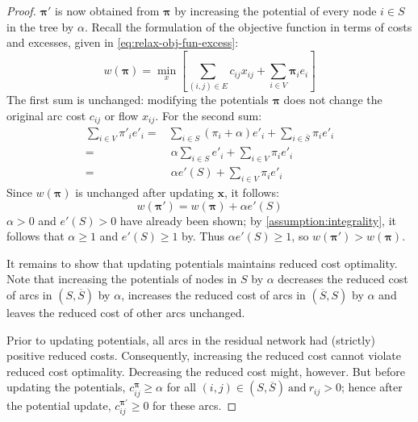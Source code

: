 \begin{proof}
$\boldsymbol{\pi}'$ is now obtained from $\boldsymbol{\pi}$ by increasing the potential of every node $i \in S$ in the tree by $\alpha$. Recall the formulation of the objective function in terms of costs and excesses, given in \cref{eq:relax-obj-fun-excess}:
\[w\left(\boldsymbol{\pi}\right)=\min_{x}\left[\sum_{\left(i,j\right)\in E}c_{ij}x_{ij}+\sum_{i\in V}\boldsymbol{\pi}_{i}e_{i}\right]\]
The first sum is unchanged: modifying the potentials $\boldsymbol{\pi}$ does not change the original arc cost $c_{ij}$ or flow $x_{ij}$. For the second sum:
\begin{align*}
\sum_{i\in V}\pi'_{i}e'_{i}= & \sum_{i\in S}\left(\pi_{i}+\alpha\right)e'_{i}+\sum_{i\in\overline{S}}\pi_{i}e'_{i}\\
= &\:\alpha\sum_{i\in S}e'_{i}+\sum_{i\in V}\pi_{i}e'_{i}\\
= &\:\alpha e'(S)+\sum_{i\in V}\pi_{i}e'_{i}
\end{align*}
Since $w\left(\boldsymbol{\pi}\right)$ is unchanged after updating $\mathbf{x}$, it follows:
\[w\left(\boldsymbol{\pi}'\right)=w(\boldsymbol{\pi})+\alpha e'(S)\]
$\alpha > 0$ and $e'(S) > 0$ have already been shown; by \cref{assumption:integrality}, it follows that $\alpha \geq 1 $ and $e'(S) \geq 1$ by. Thus $\alpha e'(S) \geq 1$, so $w\left(\boldsymbol{\pi}'\right) > w\left(\boldsymbol{\pi}\right)$.

It remains to show that updating potentials maintains reduced cost optimality. Note that increasing the potentials of nodes in $S$ by $\alpha$ decreases the reduced cost of arcs in $\left(S,\overline{S}\right)$ by $\alpha$, increases the reduced cost of arcs in $\left(\overline{S},S\right)$ by $\alpha$ and leaves the reduced cost of other arcs unchanged.

Prior to updating potentials, all arcs in the residual network had (strictly) positive reduced costs. Consequently, increasing the reduced cost cannot violate reduced cost optimality\footnotemark. Decreasing the reduced cost might, however. But before updating the potentials, $c_{ij}^{\boldsymbol{\pi}} \geq \alpha$ for all $(i,j)\in\left(S,\overline{S}\right)\:\mbox{and}\:r_{ij}>0$; hence after the potential update, $c_{ij}^{\boldsymbol{\pi}'}\geq 0$ for these arcs.
\end{proof}


